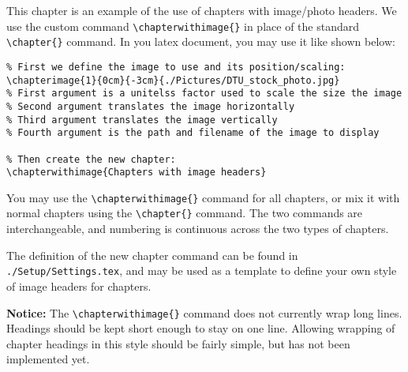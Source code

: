 
This chapter is an example of the use of chapters with image/photo headers. We use the custom command \texttt{\textbackslash chapterwithimage\{\}} in place of the standard  \texttt{\textbackslash chapter\{\}} command. In you latex document, you may use it like shown below:


\begin{verbatim}
% First we define the image to use and its position/scaling:
\chapterimage{1}{0cm}{-3cm}{./Pictures/DTU_stock_photo.jpg}
% First argument is a unitelss factor used to scale the size the image
% Second argument translates the image horizontally
% Third argument translates the image vertically
% Fourth argument is the path and filename of the image to display

% Then create the new chapter:
\chapterwithimage{Chapters with image headers}
\end{verbatim}

You may use the \texttt{\textbackslash chapterwithimage\{\}} command for all chapters, or mix it with normal chapters using the \texttt{\textbackslash chapter\{\}} command. The two commands are interchangeable, and numbering is continuous across the two types of chapters.

The definition of the new chapter command can be found in \texttt{./Setup/Settings.tex}, and may be used as a template to define your own style of image headers for chapters.

{\bfseries Notice:} The \texttt{\textbackslash chapterwithimage\{\}} command does not currently wrap long lines. Headings should be kept short enough to stay on one line. Allowing wrapping of chapter headings in this style should be fairly simple, but has not been implemented yet.